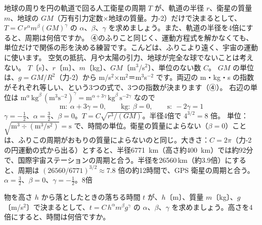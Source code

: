 \begin{phreidai}\label{ph:力-15:ex3}
地球の周りを円の軌道で回る人工衛星の周期 $T$ が、軌道の半径 $r$、衛星の質量 $m$、地球の $GM$（万有引力定数×地球の質量。力-2）だけで決まるとして、$T=C\,r^{\alpha}m^{\beta}(GM)^{\gamma}$ の $\alpha $、$\beta $、$\gamma $ を求めましょう。また、軌道の半径を4倍にすると、周期は何倍ですか。
\phbamen
④のふりこと同じく、運動方程式を解かなくても、単位だけで関係の形を決める練習です。こんどは、ふりこより遠く、宇宙の運動に使います。
\phmushi
空気の抵抗、月や太陽の引力、地球が完全な球でないことは考えない。
\phzu
$T$〔s〕、$r$〔m〕、$m$〔kg〕、$GM$〔m$^3$/s$^2$〕、単位のない数 $C$。
\phriyu
$GM$ の単位は、$g=GM/R^2$（力-2）から m/s$^2$×m$^2$＝m$^3$s$^{-2}$ です。両辺の m・kg・s の指数がそれぞれ等しい、という3つの式で、3つの指数が決まります（④）。
\phtateru
右辺の単位は $\text{m}^{\alpha}\,\text{kg}^{\beta}\,(\text{m}^3\text{s}^{-2})^{\gamma}=\text{m}^{\alpha+3\gamma}\,\text{kg}^{\beta}\,\text{s}^{-2\gamma}$ なので
\[\text{m}:\ \alpha +3\gamma =0,\qquad\text{kg}:\ \beta =0,\qquad\text{s}:\ -2\gamma =1\]
\phtoku
$\gamma =-\tfrac{1}{2}$、$\alpha =\tfrac{3}{2}$、$\beta =0$。$T=C\sqrt{r^3/(GM)}$。半径4倍で $4^{3/2}=8$ 倍。
\phtashikame
単位：$\sqrt{\text{m}^3\div(\text{m}^3/\text{s}^2)}=\text{s}$ で、時間の単位。衛星の質量によらない（$\beta=0$）ことは、ふりこの周期がおもりの質量によらないのと同じ。大きさ：$C=2\pi$（力-2 の円運動の式から出る）とすると、半径\qty{6771}{km}（高さ約\qty{400}{km}）では約92分で、国際宇宙ステーションの周期と合う。半径を\num{26560}\,km（約3.9倍）にすると、周期は $(26560/6771)^{3/2}\approx7.8$ 倍の約12時間で、GPS 衛星の周期と合う。
\kotae $\alpha =\tfrac{3}{2}$、$\beta =0$、$\gamma =-\tfrac{1}{2}$。8倍
\end{phreidai}
\begin{jibun}
物を高さ $h$ から落としたときの落ちる時間 $t$ が、$h$〔m〕、質量 $m$〔kg〕、$g$〔m/s$^2$〕で決まるとして、$t=C\,h^{\alpha}m^{\beta}g^{\gamma}$ の $\alpha $、$\beta $、$\gamma $ を求めましょう。高さを4倍にすると、時間は何倍ですか。
\end{jibun}

